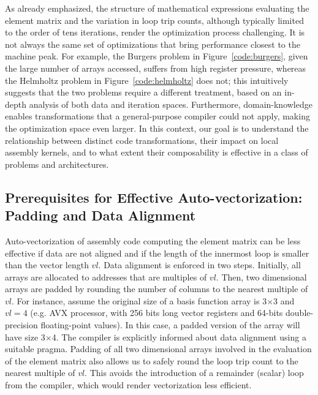 \documentclass[conference]{IEEEtran}
\begin{document}
As already emphasized, the structure of mathematical expressions evaluating the element matrix and the variation in loop trip counts, although typically limited to the order of tens iterations, render the optimization process challenging. It is not always the same set of optimizations that bring performance closest to the machine peak. For example, the Burgers problem in Figure~\ref{code:burgers}, given the large number of arrays accessed, suffers from high register pressure, whereas the Helmholtz problem in Figure~\ref{code:helmholtz} does not; this intuitively suggests that the two problems require a different treatment, based on an in-depth analysis of both data and iteration spaces. Furthermore, domain-knowledge enables transformations that a general-purpose compiler could not apply, making the optimization space even larger. In this context, our goal is to understand the relationship between distinct code transformations, their impact on local assembly kernels, and to what extent their composability is effective in a class of problems and architectures.


\subsection{Prerequisites for Effective Auto-vectorization: Padding and Data Alignment}
Auto-vectorization of assembly code computing the element matrix can be less effective if data are not aligned and if the length of the innermost loop is smaller than the vector length $vl$. Data alignment is enforced in two steps. Initially, all arrays are allocated to addresses that are multiples of $vl$. Then, two dimensional arrays are padded by rounding the number of columns to the nearest multiple of $vl$. For instance, assume the original size of a basis function array is 3$\times$3 and $vl=4$ (e.g. AVX processor, with 256 bits long vector registers and 64-bits double-precision floating-point values). In this case, a padded version of the array will have size 3$\times$4. The compiler is explicitly informed about data alignment using a suitable pragma. Padding of all two dimensional arrays involved in the evaluation of the element matrix also allows us to safely round the loop trip count to the nearest multiple of $vl$. This avoids the introduction of a remainder (scalar) loop from the compiler, which would render vectorization less efficient.
\end{document}

